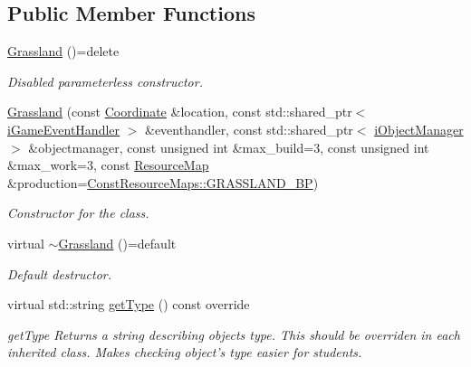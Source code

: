 \subsection*{Public Member Functions}
\begin{DoxyCompactItemize}
\item 
\hyperlink{classCourse_1_1Grassland_a1263204b4995f7306d9a78c5769e30c0}{Grassland} ()=delete
\begin{DoxyCompactList}\small\item\em Disabled parameterless constructor. \end{DoxyCompactList}\item 
\hyperlink{classCourse_1_1Grassland_a8d7239afef39efc0531c74ece6ecdc67}{Grassland} (const \hyperlink{classCourse_1_1Coordinate}{Coordinate} \&location, const std\-::shared\-\_\-ptr$<$ \hyperlink{classCourse_1_1iGameEventHandler}{i\-Game\-Event\-Handler} $>$ \&eventhandler, const std\-::shared\-\_\-ptr$<$ \hyperlink{classCourse_1_1iObjectManager}{i\-Object\-Manager} $>$ \&objectmanager, const unsigned int \&max\-\_\-build=3, const unsigned int \&max\-\_\-work=3, const \hyperlink{namespaceCourse_ab9a46ed9cd00485e318e5731ea2f78d9}{Resource\-Map} \&production=\hyperlink{namespaceCourse_1_1ConstResourceMaps_aae4ef780a53ec4726ff947ecae010082}{Const\-Resource\-Maps\-::\-G\-R\-A\-S\-S\-L\-A\-N\-D\-\_\-\-B\-P})
\begin{DoxyCompactList}\small\item\em Constructor for the class. \end{DoxyCompactList}\item 
virtual \hyperlink{classCourse_1_1Grassland_aa660837530ab2dcc563c9557ec599066}{$\sim$\-Grassland} ()=default
\begin{DoxyCompactList}\small\item\em Default destructor. \end{DoxyCompactList}\item 
virtual std\-::string \hyperlink{classCourse_1_1Grassland_a0a652bbecdda0216613dad980936e30e}{get\-Type} () const override
\begin{DoxyCompactList}\small\item\em get\-Type Returns a string describing objects type. This should be overriden in each inherited class. Makes checking object's type easier for students. \end{DoxyCompactList}\end{DoxyCompactItemize}
